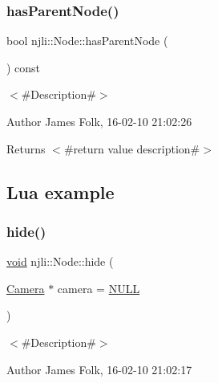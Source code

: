 \subsubsection{\texorpdfstring{has\+Parent\+Node()}{hasParentNode()}}
{\footnotesize\ttfamily bool njli\+::\+Node\+::has\+Parent\+Node (\begin{DoxyParamCaption}{ }\end{DoxyParamCaption}) const}



$<$\#\+Description\#$>$ 

\begin{DoxyAuthor}{Author}
James Folk, 16-\/02-\/10 21\+:02\+:26
\end{DoxyAuthor}
\begin{DoxyReturn}{Returns}
$<$\#return value description\#$>$
\end{DoxyReturn}
\hypertarget{classnjli_1_1_steering_behavior_wander_ex1}{}\subsection{Lua example}\label{classnjli_1_1_steering_behavior_wander_ex1}

\begin{DoxyCodeInclude}
\end{DoxyCodeInclude}
\mbox{\label{classnjli_1_1_node_acf8e0b415e5b6e1c753ec9f0de5ec61d}} 
\subsubsection{\texorpdfstring{hide()}{hide()}}
{\footnotesize\ttfamily \mbox{\hyperlink{_thread_8h_af1e856da2e658414cb2456cb6f7ebc66}{void}} njli\+::\+Node\+::hide (\begin{DoxyParamCaption}\item[{\mbox{\hyperlink{classnjli_1_1_camera}{Camera}} $\ast$}]{camera = {\ttfamily \mbox{\hyperlink{_util_8h_a070d2ce7b6bb7e5c05602aa8c308d0c4}{N\+U\+LL}}} }\end{DoxyParamCaption})}



$<$\#\+Description\#$>$ 

\begin{DoxyAuthor}{Author}
James Folk, 16-\/02-\/10 21\+:02\+:17
\end{DoxyAuthor}

